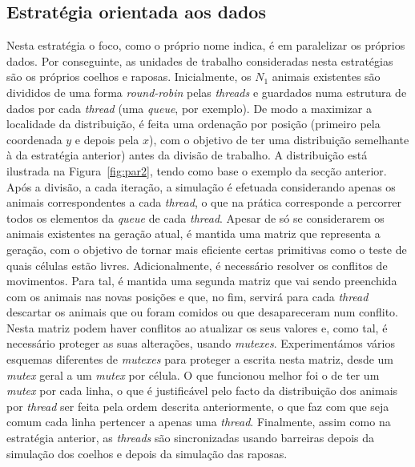 \documentclass[10pt,a4paper,oneside]{article}
\begin{document}
\subsection{Estratégia orientada aos dados}
Nesta estratégia o foco, como o próprio nome indica, é em paralelizar
os próprios dados. Por conseguinte, as unidades de trabalho
consideradas nesta estratégias são os próprios coelhos e
raposas. Inicialmente, os $N_1$ animais existentes são divididos de
uma forma \textit{round-robin} pelas \textit{threads} e guardados numa
estrutura de dados por cada \textit{thread} (uma \textit{queue}, por
exemplo). De modo a maximizar a localidade da distribuição, é feita
uma ordenação por posição (primeiro pela coordenada $y$ e depois pela
$x$), com o objetivo de ter uma distribuição semelhante à da
estratégia anterior) antes da divisão de trabalho. A distribuição está
ilustrada na Figura~\ref{fig:par2}, tendo como base o exemplo da
secção anterior. Após a divisão, a cada iteração, a simulação é
efetuada considerando apenas os animais correspondentes a cada
\textit{thread}, o que na prática corresponde a percorrer todos os
elementos da \textit{queue} de cada \textit{thread}. Apesar de só se
considerarem os animais existentes na geração atual, é mantida uma
matriz que representa a geração, com o objetivo de tornar mais
eficiente certas primitivas como o teste de quais células estão
livres. Adicionalmente, é necessário resolver os conflitos de
movimentos. Para tal, é mantida uma segunda matriz que vai sendo
preenchida com os animais nas novas posições e que, no fim, servirá
para cada \textit{thread} descartar os animais que ou foram comidos ou
que desapareceram num conflito. Nesta matriz podem haver conflitos ao
atualizar os seus valores e, como tal, é necessário proteger as suas
alterações, usando \textit{mutexes}. Experimentámos vários esquemas
diferentes de \textit{mutexes} para proteger a escrita nesta matriz,
desde um \textit{mutex} geral a um \textit{mutex} por célula. O que
funcionou melhor foi o de ter um \textit{mutex} por cada linha, o que
é justificável pelo facto da distribuição dos animais por
\textit{thread} ser feita pela ordem descrita anteriormente, o que faz
com que seja comum cada linha pertencer a apenas uma
\textit{thread}. Finalmente, assim como na estratégia anterior, as
\textit{threads} são sincronizadas usando barreiras depois da
simulação dos coelhos e depois da simulação das raposas.
\end{document}
